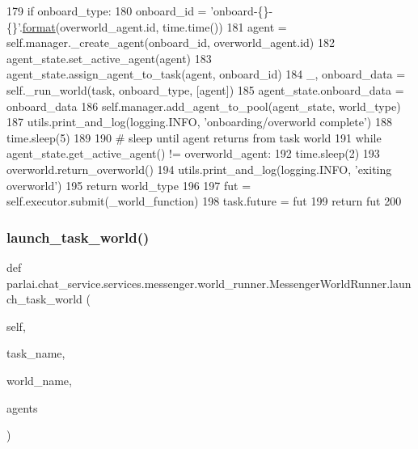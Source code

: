 \begin{DoxyCode}
179                 \textcolor{keywordflow}{if} onboard\_type:
180                     onboard\_id = \textcolor{stringliteral}{'onboard-\{\}-\{\}'}.\hyperlink{namespaceparlai_1_1chat__service_1_1services_1_1messenger_1_1shared__utils_a32e2e2022b824fbaf80c747160b52a76}{format}(overworld\_agent.id, time.time())
181                     agent = self.manager.\_create\_agent(onboard\_id, overworld\_agent.id)
182                     agent\_state.set\_active\_agent(agent)
183                     agent\_state.assign\_agent\_to\_task(agent, onboard\_id)
184                     \_, onboard\_data = self.\_run\_world(task, onboard\_type, [agent])
185                     agent\_state.onboard\_data = onboard\_data
186                 self.manager.add\_agent\_to\_pool(agent\_state, world\_type)
187                 utils.print\_and\_log(logging.INFO, \textcolor{stringliteral}{'onboarding/overworld complete'})
188                 time.sleep(5)
189 
190                 \textcolor{comment}{# sleep until agent returns from task world}
191                 \textcolor{keywordflow}{while} agent\_state.get\_active\_agent() != overworld\_agent:
192                     time.sleep(2)
193                 overworld.return\_overworld()
194             utils.print\_and\_log(logging.INFO, \textcolor{stringliteral}{'exiting overworld'})
195             \textcolor{keywordflow}{return} world\_type
196 
197         fut = self.executor.submit(\_world\_function)
198         task.future = fut
199         \textcolor{keywordflow}{return} fut
200 \end{DoxyCode}
\mbox{\label{classparlai_1_1chat__service_1_1services_1_1messenger_1_1world__runner_1_1MessengerWorldRunner_a45a5944b8a5a786163c3e1ceb9437b15}} 
\subsubsection{\texorpdfstring{launch\+\_\+task\+\_\+world()}{launch\_task\_world()}}
{\footnotesize\ttfamily def parlai.\+chat\+\_\+service.\+services.\+messenger.\+world\+\_\+runner.\+Messenger\+World\+Runner.\+launch\+\_\+task\+\_\+world (\begin{DoxyParamCaption}\item[{}]{self,  }\item[{}]{task\+\_\+name,  }\item[{}]{world\+\_\+name,  }\item[{}]{agents }\end{DoxyParamCaption})}

